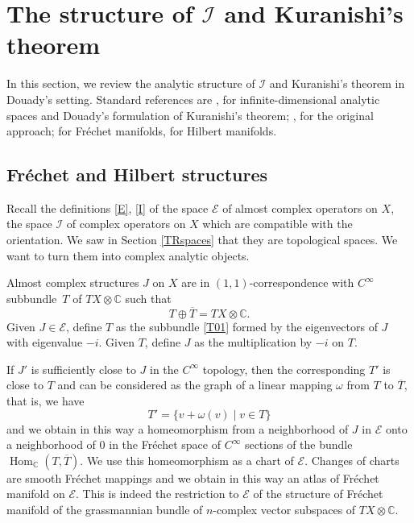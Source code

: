 \documentclass[JEP,XML,SOM,Unicode]{cedram}
\let\mathcal\mathscr
\DeclareMathOperator{\Hom}{Hom}
\theoremstyle{plain}
\theoremstyle{definition}
\theoremstyle{remark}
\numberwithin{equation}{section}
\newcommand{\CC}{{\mathbb{C}}}
\newcommand{\cI}{\mathcal{I}}
\begin{document}
\section{The structure of \texorpdfstring{$\cI$}{I} and Kuranishi's theorem}
\label{Istructure}

In this section, we review the analytic structure of $\cI$ and Kuranishi's theorem in Douady's setting. Standard references are \cite{Douady}, \cite{DouadyBourbaki} for infinite-dimensional analytic spaces and Douady's formulation of Kuranishi's theorem; \cite{Kur1}, \cite{Ku3} for the original approach; \cite[\S I.4]{Hamilton} for Fréchet manifolds, \cite{Lang} for Hilbert manifolds.

\subsection{Fréchet and Hilbert structures}
\label{FrHilb}

Recall the definitions \eqref{E}, \resp \eqref{I} of the space $\mathcal E$ of almost complex operators on $X$, \resp the space $\cI$ of complex operators on $X$ which are compatible with the orientation. We saw in Section \ref{TRspaces} that they are topological spaces. We want to turn them into complex analytic objects.

Almost complex structures $J$ on $X$ are in $(1,1)$-correspondence with $C^\infty$ subbundle~$T$ of $TX\otimes \CC$ such that
\begin{equation*}
T\oplus\overline{T}=TX\otimes \CC.
\end{equation*}
Given $J\in\mathcal E$, define $T$ as the subbundle \eqref{T01} formed by the eigenvectors of $J$ with eigenvalue $-i$. Given $T$, define $J$ as the multiplication by $-i$ on $T$.

If $J'$ is sufficiently close to $J$ in the $C^\infty$ topology, then the corresponding $T'$ is close to $T$ and can be considered as the graph of a linear mapping $\omega$ from $T$ to $\overline{T}$, that is, we have
\begin{equation*}
T'=\{v+\omega (v)\mid v\in T\}
\end{equation*}
and we obtain in this way a homeomorphism from a neighborhood of $J$ in $\mathcal E$ onto a neighborhood of $0$ in the Fréchet space of $C^\infty$ sections of the bundle $\Hom_{\CC}(T,\overline{T})$.
We use this homeomorphism as a chart of $\mathcal E$. Changes of charts are smooth Fréchet mappings and we obtain in this way an atlas of Fréchet manifold on $\mathcal E$. This is indeed the restriction to $\mathcal E$ of the structure of Fréchet manifold of the grassmannian bundle of $n$-complex vector subspaces of $TX\otimes\CC$.
\end{document}
